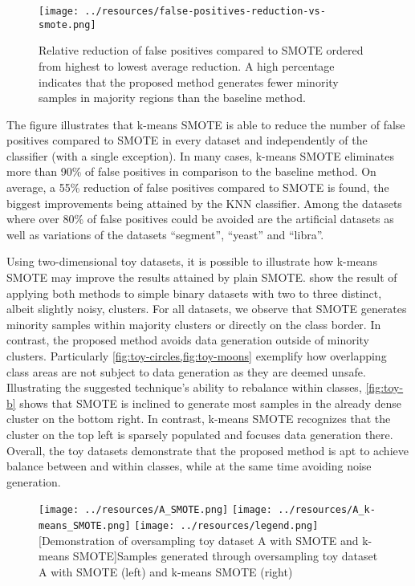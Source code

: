 \documentclass[sort&compress]{elsarticle}
\begin{document}
\begin{figure}[ht]
	\centering
	\texttt{[image: ../resources/false-positives-reduction-vs-smote.png]}
	\caption[Relative reduction of false positives compared to \acs{SMOTE}]{Relative reduction of false positives compared to \acs{SMOTE} ordered from highest to lowest average reduction. A high percentage indicates that the proposed method generates fewer minority samples in majority regions than the baseline method.}
	\label{fig:false_positives_reduction}
\end{figure}

The figure illustrates that k-means \ac{SMOTE} is able to reduce the number of false positives compared to \ac{SMOTE} in every dataset and independently of the classifier (with a single exception). In many cases, k-means \ac{SMOTE} eliminates more than 90\% of false positives in comparison to the baseline method. On average, a 55\% reduction of false positives compared to \ac{SMOTE} is found, the biggest improvements being attained by the \ac{KNN} classifier. Among the datasets where over 80\% of false positives could be avoided are the artificial datasets as well as variations of the datasets ``segment'', ``yeast'' and ``libra''.

Using two-dimensional toy datasets, it is possible to illustrate how k-means \ac{SMOTE} may improve the results attained by plain \ac{SMOTE}.  show the result of applying both methods to simple binary datasets with two to three distinct, albeit slightly noisy, clusters. For all datasets, we observe that \ac{SMOTE} generates minority samples within majority clusters or directly on the class border. In contrast, the proposed method avoids data generation outside of minority clusters. Particularly \cref{fig:toy-circles,fig:toy-moons} exemplify how overlapping class areas are not subject to data generation as they are deemed unsafe. Illustrating the suggested technique's ability to rebalance within classes, \cref{fig:toy-b} shows that \ac{SMOTE} is inclined to generate most samples in the already dense cluster on the bottom right. In contrast, k-means \ac{SMOTE} recognizes that the cluster on the top left is sparsely populated and focuses data generation there. Overall, the toy datasets demonstrate that the proposed method is apt to achieve balance between and within classes, while at the same time avoiding noise generation.

\begin{figure}[ht]
	\centering
	\texttt{[image: ../resources/A\_SMOTE.png]}
	\hfill
	\texttt{[image: ../resources/A\_k-means\_SMOTE.png]}
	\texttt{[image: ../resources/legend.png]}
	[Demonstration of oversampling toy dataset A with \acs{SMOTE} and k-means \acs{SMOTE}]{Samples generated through oversampling toy dataset A with \acs{SMOTE} (left) and k-means \acs{SMOTE} (right)}
	\label{fig:toy-a}
 \end{figure}
\end{document}
